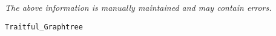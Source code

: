 \label{pkg:planar\_graphtree}

{\tiny \it The above information is manually maintained and may contain errors.}
\begin{verbatim}
Traitful_Graphtree
\end{verbatim}
